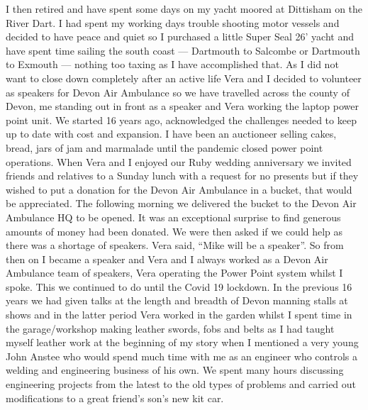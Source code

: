 I then retired and have spent some days on my yacht moored at Dittisham on the
River Dart. I had spent my working days trouble shooting motor vessels and
decided to have peace and quiet so I purchased a little Super Seal 26' yacht
and have spent time sailing the south coast --- Dartmouth to Salcombe or
Dartmouth to Exmouth --- nothing too taxing as I have accomplished that. As I
did not want to close down completely after an active life Vera and I decided
to volunteer as speakers for Devon Air Ambulance so we have travelled across
the county of Devon, me standing out in front as a speaker and Vera working the
laptop power point unit. We started 16 years ago, acknowledged the challenges
needed to keep up to date with cost and expansion. I have been an auctioneer
selling cakes, bread, jars of jam and marmalade until the pandemic closed power
point operations. When Vera and I enjoyed our Ruby wedding anniversary we
invited friends and relatives to a Sunday lunch with a request for no presents
but if they wished to put a donation for the Devon Air Ambulance in a bucket,
that would be appreciated. The following morning we delivered the bucket  to
the Devon Air Ambulance HQ to be opened. It was an exceptional surprise to find
generous amounts of money had been donated. We were then asked if we could help
as there was a shortage of speakers. Vera said, ``Mike will be a speaker''. So
from then on I became a speaker and Vera and I always worked as a Devon Air
Ambulance team of speakers, Vera operating the Power Point system whilst I
spoke. This we continued to do until the Covid 19 lockdown. In the previous 16
years we had given talks at the length and breadth of Devon manning stalls at
shows and in the latter period Vera worked in the garden whilst I spent time in
the garage/workshop making leather swords, fobs and belts as I had taught
myself leather work at the beginning of my story when I mentioned a very young
John Anstee who would spend much time with me as an engineer who controls a
welding and engineering business of his own. We spent many hours discussing
engineering projects from the latest to the old types of problems and carried
out modifications to a great friend's son's new kit car.


